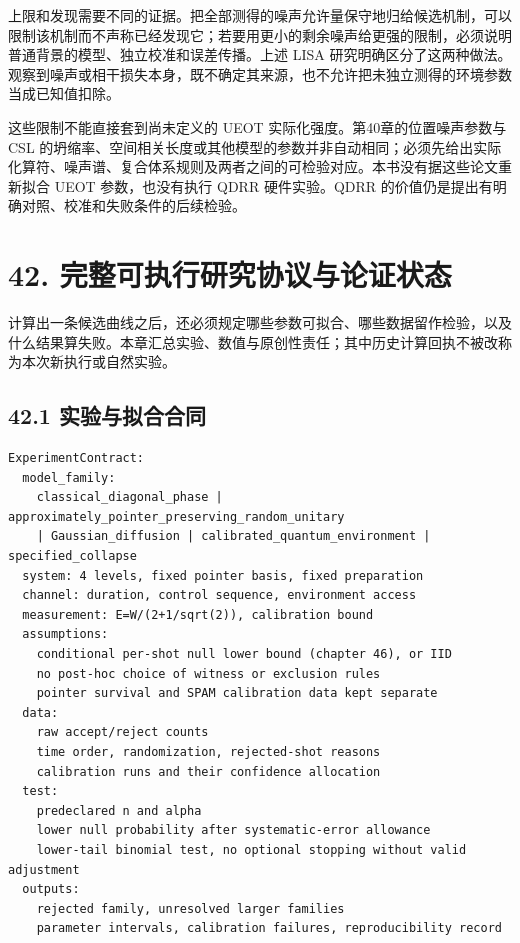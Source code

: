 \documentclass[
  11pt,
  oneside]{book}
\begin{document}
上限和发现需要不同的证据。把全部测得的噪声允许量保守地归给候选机制，可以限制该机制而不声称已经发现它；若要用更小的剩余噪声给更强的限制，必须说明普通背景的模型、独立校准和误差传播。上述
LISA
研究明确区分了这两种做法。观察到噪声或相干损失本身，既不确定其来源，也不允许把未独立测得的环境参数当成已知值扣除。

这些限制不能直接套到尚未定义的 UEOT 实际化强度。第40章的位置噪声参数与
CSL
的坍缩率、空间相关长度或其他模型的参数并非自动相同；必须先给出实际化算符、噪声谱、复合体系规则及两者之间的可检验对应。本书没有据这些论文重新拟合
UEOT 参数，也没有执行 QDRR 硬件实验。QDRR
的价值仍是提出有明确对照、校准和失败条件的后续检验。

\chapter{42. 完整可执行研究协议与论证状态}\label{ch-42}\hypertarget{ch-42}{}

计算出一条候选曲线之后，还必须规定哪些参数可拟合、哪些数据留作检验，以及什么结果算失败。本章汇总实验、数值与原创性责任；其中历史计算回执不被改称为本次新执行或自然实验。

\section{42.1 实验与拟合合同}

\begin{Verbatim}[breaklines,breakanywhere,fontsize=\scriptsize]
ExperimentContract:
  model_family:
    classical_diagonal_phase | approximately_pointer_preserving_random_unitary
    | Gaussian_diffusion | calibrated_quantum_environment | specified_collapse
  system: 4 levels, fixed pointer basis, fixed preparation
  channel: duration, control sequence, environment access
  measurement: E=W/(2+1/sqrt(2)), calibration bound
  assumptions:
    conditional per-shot null lower bound (chapter 46), or IID
    no post-hoc choice of witness or exclusion rules
    pointer survival and SPAM calibration data kept separate
  data:
    raw accept/reject counts
    time order, randomization, rejected-shot reasons
    calibration runs and their confidence allocation
  test:
    predeclared n and alpha
    lower null probability after systematic-error allowance
    lower-tail binomial test, no optional stopping without valid adjustment
  outputs:
    rejected family, unresolved larger families
    parameter intervals, calibration failures, reproducibility record
\end{Verbatim}
\end{document}
